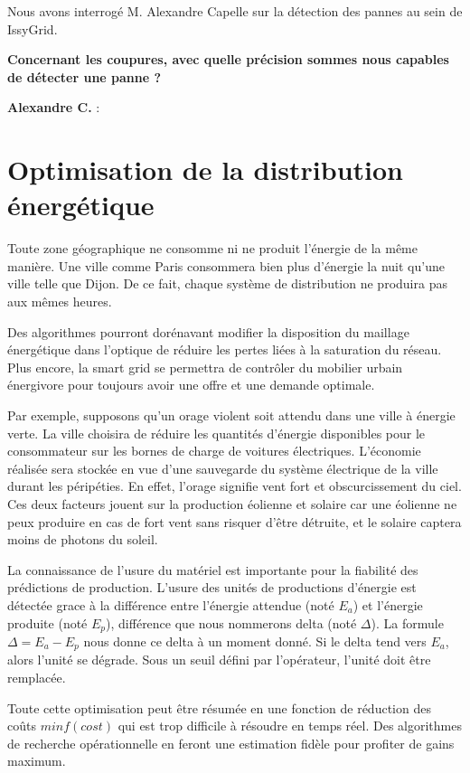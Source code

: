 Nous avons interrogé M. Alexandre Capelle sur la détection des pannes au sein de IssyGrid.

\textbf{Concernant les coupures, avec quelle précision sommes nous capables de détecter une panne ?}

\textbf{Alexandre C.} :


\section{Optimisation de la distribution énergétique}

Toute zone géographique ne consomme ni ne produit l'énergie de la même manière.
Une ville comme Paris consommera bien plus d'énergie la nuit qu'une ville telle que Dijon.
De ce fait, chaque système de distribution ne produira pas aux mêmes heures.

Des algorithmes pourront dorénavant modifier la disposition du maillage énergétique dans l'optique
de réduire les pertes liées à la saturation du réseau. Plus encore, la smart grid se permettra de contrôler
du mobilier urbain énergivore pour toujours avoir une offre et une demande optimale.

Par exemple, supposons qu'un orage violent soit attendu dans une ville à énergie verte.
La ville choisira de réduire les quantités d'énergie disponibles pour le consommateur sur les bornes
de charge de voitures électriques.
L'économie réalisée sera stockée en vue d'une sauvegarde du système électrique de la ville durant les péripéties.
En effet, l'orage signifie vent fort et obscurcissement du ciel. Ces deux facteurs jouent sur la production
éolienne et solaire car une éolienne ne peux produire en cas de fort vent sans risquer d'être détruite, et le solaire
captera moins de photons du soleil.

La connaissance de l'usure du matériel est importante pour la fiabilité des prédictions de production.
L'usure des unités de productions d'énergie est détectée grace à la différence entre l'énergie attendue
(noté $E_a$) et l'énergie produite (noté $E_p$), différence que nous nommerons delta (noté $\Delta$).
La formule $\Delta = E_a - E_p$ nous donne ce delta à un moment donné.
Si le delta tend vers $E_a$, alors l'unité se dégrade. Sous un seuil défini par l'opérateur,
l'unité doit être remplacée.

Toute cette optimisation peut être résumée en une fonction de réduction des coûts $min f(cost)$ qui est trop difficile
à résoudre en temps réel. Des algorithmes de recherche opérationnelle en feront une estimation fidèle
pour profiter de gains maximum.

